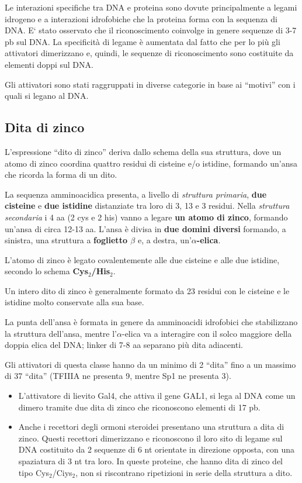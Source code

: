 \documentclass[11pt]{book}
\begin{document}
Le interazioni specifiche tra DNA e proteina sono dovute principalmente
a legami idrogeno e a interazioni idrofobiche che la proteina forma con
la sequenza di DNA. E` stato osservato che il riconoscimento coinvolge
in genere sequenze di 3-7 pb sul DNA. La specificità di legame è
aumentata dal fatto che per lo più gli attivatori dimerizzano e, quindi,
le sequenze di riconoscimento sono costituite da elementi doppi sul DNA.

Gli attivatori sono stati raggruppati in diverse categorie in base ai
``motivi'' con i quali si legano al DNA.

\subsection{Dita di zinco}\label{dita-di-zinco}

L'espressione ``dito di zinco'' deriva dallo schema della sua struttura,
dove un atomo di zinco coordina quattro residui di cisteine e/o
istidine, formando un'ansa che ricorda la forma di un dito.

La sequenza amminoacidica presenta, a livello di \emph{struttura
primaria}, \textbf{due cisteine} e \textbf{due istidine} distanziate tra
loro di 3, 13 e 3 residui. Nella \emph{struttura secondaria} i 4 aa (2
cys e 2 his) vanno a legare \textbf{un atomo di zinco}, formando un'ansa
di circa 12-13 aa. L'ansa è divisa in \textbf{due domini diversi}
formando, a sinistra, una struttura a \textbf{foglietto \(\beta\)} e, a
destra, un'\textbf{\(\alpha\)-elica}.

L'atomo di zinco è legato covalentemente alle due cisteine e alle due
istidine, secondo lo schema \textbf{Cys\(_2\)/His\(_2\)}.

Un intero dito di zinco è generalmente formato da 23 residui con le
cisteine e le istidine molto conservate alla sua base.

La punta dell'ansa è formata in genere da amminoacidi idrofobici che
stabilizzano la struttura dell'ansa, mentre l'\(\alpha\)-elica va a
interagire con il solco maggiore della doppia elica del DNA; linker di
7-8 aa separano più dita adiacenti.

Gli attivatori di questa classe hanno da un minimo di 2 ``dita'' fino a
un massimo di 37 ``dita'' (TFIIIA ne presenta 9, mentre Sp1 ne presenta
3).

\begin{itemize}
\item
  L'attivatore di lievito Gal4, che attiva il gene GAL1, si lega al DNA
  come un dimero tramite due dita di zinco che riconoscono elementi di
  17 pb.
\item
  Anche i recettori degli ormoni steroidei presentano una struttura a
  dita di zinco. Questi recettori dimerizzano e riconoscono il loro sito
  di legame sul DNA costituito da 2 sequenze di 6 nt orientate in
  direzione opposta, con una spaziatura di 3 nt tra loro. In queste
  proteine, che hanno dita di zinco del tipo Cys\(_2\)/Ciys\(_2\), non
  si riscontrano ripetizioni in serie della struttura a dito.
\end{itemize}
\end{document}
